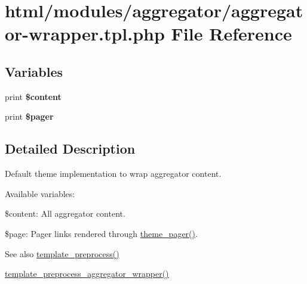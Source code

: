 \hypertarget{aggregator-wrapper_8tpl_8php}{
\section{html/modules/aggregator/aggregator-\/wrapper.tpl.php File Reference}
\label{aggregator-wrapper_8tpl_8php}
}
\subsection*{Variables}
\begin{DoxyCompactItemize}
\item 
\hypertarget{aggregator-wrapper_8tpl_8php_ab7b7210f43aa78e34f0b202de894a74c}{
print {\bfseries \$content}}
\label{aggregator-wrapper_8tpl_8php_ab7b7210f43aa78e34f0b202de894a74c}

\item 
\hypertarget{aggregator-wrapper_8tpl_8php_a832d48720a0d8c51e6a14792173c3a61}{
print {\bfseries \$pager}}
\label{aggregator-wrapper_8tpl_8php_a832d48720a0d8c51e6a14792173c3a61}

\end{DoxyCompactItemize}


\subsection{Detailed Description}
Default theme implementation to wrap aggregator content.

Available variables:
\begin{DoxyItemize}
\item \$content: All aggregator content.
\item \$page: Pager links rendered through \hyperlink{group__themeable_ga3bfc8e62230af3fb60b061ee67c6d045}{theme\_\-pager()}.
\end{DoxyItemize}

\begin{DoxySeeAlso}{See also}
\hyperlink{includes_2theme_8inc_a3eeb7bcdba7ef4859f99586da264d347}{template\_\-preprocess()} 

\hyperlink{aggregator_8pages_8inc_a95bcd00a54c249668f911199fa8021ba}{template\_\-preprocess\_\-aggregator\_\-wrapper()} 
\end{DoxySeeAlso}
